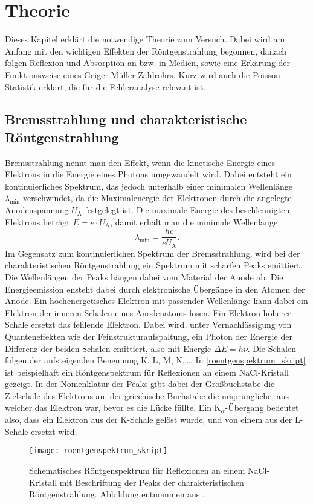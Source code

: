 \section{Theorie}
\label{sec:theorie}
Dieses Kapitel erklärt die notwendige Theorie zum Versuch. Dabei wird am Anfang mit den wichtigen Effekten der Röntgenstrahlung begonnen, danach folgen Reflexion und Absorption an bzw. in Medien, sowie eine Erkärung der Funktionsweise eines Geiger-Müller-Zählrohrs. Kurz wird auch die Poisson-Statistik erklärt, die für die Fehleranalyse relevant ist. \cite{roentgenskript}


\subsection{Bremsstrahlung und charakteristische Röntgenstrahlung}
Bremsstrahlung nennt man den Effekt, wenn die kinetische Energie eines Elektrons in die Energie eines Photons umgewandelt wird. Dabei entsteht ein kontinuierliches Spektrum, das jedoch unterhalb einer minimalen Wellenlänge $\lambda_{\mathrm{min}}$ verschwindet, da die Maximalenergie der Elektronen durch die angelegte Anodenspannung $U_{\mathrm{A}}$ festgelegt ist. Die maximale Energie des beschleunigten Elektrons beträgt $E=e\cdot U_{\mathrm{A}}$, damit erhält man die minimale Wellenlänge 
\begin{equation}
	\lambda_{\mathrm{min}}=\frac{hc}{eU_{\mathrm{A}}}. 
\end{equation} \label{eq:Plank}
Im Gegensatz zum kontinuierlichen Spektrum der Bremsstrahlung, wird bei der charakteristischen Röntgenstrahlung ein Spektrum mit scharfen Peaks emittiert. Die Wellenlängen der Peaks hängen dabei vom Material der Anode ab. Die Energieemission ensteht dabei durch elektronische Übergänge in den Atomen der Anode. Ein hochenergetisches Elektron mit passender Wellenlänge kann dabei ein Elektron der inneren Schalen eines Anodenatoms lösen. Ein Elektron höherer Schale ersetzt das fehlende Elektron. Dabei wird, unter Vernachlässigung von Quanteneffekten wie der Feinstrukturaufspaltung, ein Photon der Energie der Differenz der beiden Schalen emittiert, also mit Energie $\Delta E=h\nu$. Die Schalen folgen der aufsteigenden Benennung K, L, M, N,…. In \autoref{roentgenspektrum_skript} ist beispielhaft ein Röntgenspektrum für Reflexionen an einem NaCl-Kristall gezeigt. In der Nomenklatur der Peaks gibt dabei der Großbuchstabe die Zielschale des Elektrons an, der griechische Buchstabe die ursprüngliche, aus welcher das Elektron war, bevor es die Lücke füllte. Ein K$_\alpha$-Übergang bedeutet also, dass ein Elektron aus der K-Schale gelöst wurde, und von einem aus der L-Schale ersetzt wird.    
\begin{figure}[H]
	\centering
	\texttt{[image: roentgenspektrum\_skript]}
	\caption{Schematisches Röntgenspektrum für Reflexionen an einem NaCl-Kristall mit Beschriftung der Peaks der charakteristischen Röntgenstrahlung. Abbildung entnommen aus \cite{roentgenskript}. }
	\label{roentgenspektrum_skript}
\end{figure}

